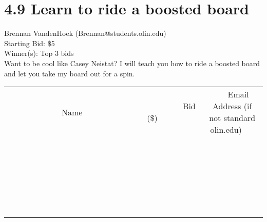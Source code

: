 \documentclass[11pt]{article}
\begin{document}
\section*{4.9 Learn to ride a boosted board}
Brennan VandenHoek  (Brennan@students.olin.edu) \\
Starting Bid: \$5 \\
Winner(s): 
Top 3 bids \\
Want to be cool like Casey Neistat? I will teach you how to ride a boosted board and let you take my board out for a spin. \\[6ex]
\begin{tabular}{c c c}
~~~~~~~~~~~~~Name~~~~~~~~~~~~~ & ~~~~~~~~~Bid (\$)~~~~~~~~~ & ~~~Email Address (if not standard olin.edu)~~~ \\
 & & \\
\hline
 & & \\
\hline
 & & \\
\hline
 & & \\
\hline
 & & \\
\hline
 & & \\
\hline
 & & \\
\hline
 & & \\
\hline
 & & \\
\hline
 & & \\
\hline
 & & \\
\hline
 & & \\
\hline
 & & \\
\hline
 & & \\
\hline
 & & \\
\hline
 & & \\
\hline
 & & \\
\hline
 & & \\
\hline
 & & \\
\hline
 & & \\
\hline
 & & \\
\hline
 & & \\
\hline
 & & \\
\hline
 & & \\
\hline
 & & \\
\hline
 & & \\
\hline
\end{tabular}
\clearpage
\end{document}
